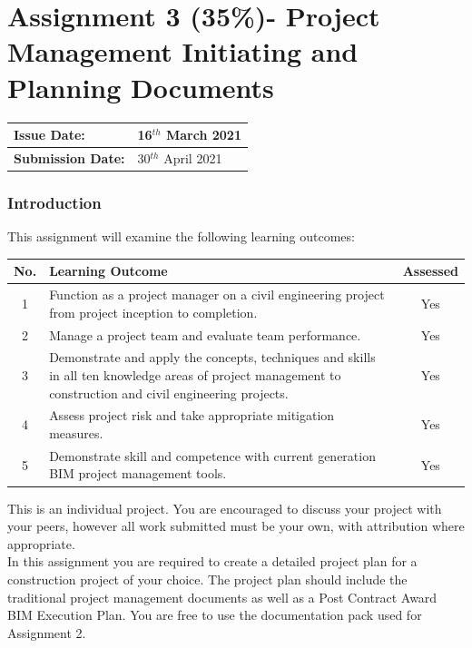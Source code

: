 
	

\part*{Assignment 3 (35\%)- Project Management Initiating and Planning Documents}


\begin{tabularx}{\textwidth}{ |X|X| }
	\hline
	\textbf{Issue Date:} & 16$^{th}$ March 2021\\
	\hline 
	\textbf{Submission Date:}  & 30$^{th}$ April 2021\\
	\hline
\end{tabularx}

\section*{Introduction}

This assignment will examine the following learning outcomes:\\

\begin{tabularx}{\textwidth}{ |c|X|c| }
	\hline
	\textbf{No.} & \textbf{Learning Outcome} & \textbf{Assessed} \\
	\hline 
	1  & Function as a project manager on a civil engineering project from project inception to completion. & Yes \\
	2  & Manage a project team and evaluate team performance. & Yes \\
	3  & Demonstrate and apply the concepts, techniques and skills in all ten knowledge areas of project management to construction and civil engineering projects. & Yes \\
	4  & Assess project risk and take appropriate mitigation measures. & Yes \\
	5  & Demonstrate skill and competence with current generation BIM project management tools. & Yes \\
	\hline
\end{tabularx}
\vspace{0.5cm}


This is an individual project.  You are encouraged to discuss your project with your peers, however all work submitted must be your own, with attribution where appropriate.\\

In this assignment you are required to create a detailed project plan for a construction project of your choice.  The project plan should include the traditional project management documents as well as a Post Contract Award BIM Execution Plan.  You are free to use the documentation pack used for Assignment 2.\\


